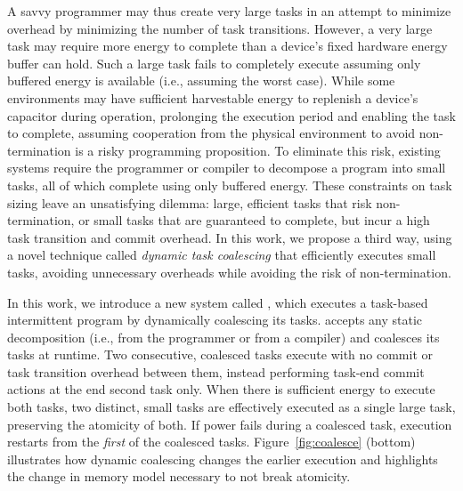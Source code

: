 A savvy programmer may thus create very large tasks in an attempt to minimize
overhead by minimizing the number of task transitions.  However, a very large
task may require more energy to complete than a device's fixed hardware energy
buffer can hold.  Such a large task fails to completely execute assuming only
buffered energy is available (i.e., assuming the worst case).  While some
environments may have sufficient harvestable energy to replenish a device's
capacitor during operation, prolonging the execution period and enabling the
task to complete, assuming cooperation from the physical environment to avoid
non-termination is a risky programming proposition.  To eliminate this risk,
existing systems require the programmer or compiler to decompose a  program
into small tasks, all of which complete using only buffered energy.  These
constraints on task sizing leave an unsatisfying dilemma: large, efficient
tasks that risk non-termination, or small tasks that are guaranteed to
complete, but incur a high task transition and commit overhead.  In this work,
we propose a third way, using a novel technique called {\em dynamic task
coalescing} that efficiently executes small tasks, avoiding unnecessary
overheads while avoiding the risk of non-termination.


In this work, we introduce a new system called \sys, which executes a task-based
intermittent program by dynamically coalescing its tasks.
\sys accepts any static decomposition (i.e., from the programmer or from a compiler) 
and coalesces its tasks at runtime. Two consecutive, coalesced tasks execute  
with no commit or task transition overhead between them, instead performing
task-end commit actions at the end second task only.
%
When there is sufficient energy to execute both tasks, two distinct, small
tasks are effectively executed as a single large task, preserving the atomicity
of both.  If power fails during a coalesced task, execution restarts from the
{\em first} of the coalesced tasks.  Figure~\ref{fig:coalesce} (bottom)
illustrates how dynamic coalescing changes the earlier execution and highlights
the change in memory model necessary to not break atomicity.

